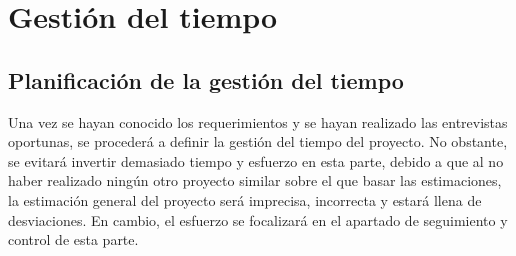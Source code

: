 \section{Gestión del tiempo}
\subsection{Planificación de la gestión del tiempo}
\label{plan:time}
Una vez se hayan conocido los requerimientos y se hayan realizado las
entrevistas oportunas, se procederá a definir la gestión del tiempo del
proyecto. No obstante, se evitará invertir demasiado tiempo y esfuerzo en
esta parte, debido a que al no haber realizado ningún otro proyecto similar
sobre el que basar las estimaciones, la estimación general del proyecto será
imprecisa, incorrecta y estará llena de desviaciones. En cambio, el esfuerzo
se focalizará en el apartado de seguimiento y control de esta parte.

